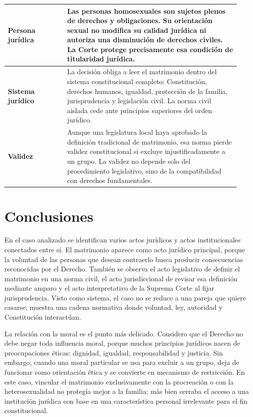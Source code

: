\documentclass[
	spanish,
	letterpaper, oneside
]{article}
\begin{document}
\begin{landscape}
\begin{longtable}{@{}p{0.24\linewidth}p{0.70\linewidth}@{}}
\textbf{Persona jurídica} &
Las personas homosexuales son sujetos plenos de derechos y obligaciones. Su orientación sexual no modifica su calidad jurídica ni autoriza una disminución de derechos civiles. La Corte protege precisamente esa condición de titularidad jurídica. \\
\midrule

\textbf{Sistema jurídico} &
La decisión obliga a leer el matrimonio dentro del sistema constitucional completo: Constitución, derechos humanos, igualdad, protección de la familia, jurisprudencia y legislación civil. La norma civil aislada cede ante principios superiores del orden jurídico. \\
\midrule

\textbf{Validez} &
Aunque una legislatura local haya aprobado la definición tradicional de matrimonio, esa norma pierde validez constitucional si excluye injustificadamente a un grupo. La validez no depende solo del procedimiento legislativo, sino de la compatibilidad con derechos fundamentales. \\

\end{longtable}
\endgroup
\end{landscape}
\clearpage
\pagestyle{fancy}

\section{Conclusiones}

En el caso analizado se identifican varios actos jurídicos y actos institucionales conectados entre sí. El matrimonio aparece como acto jurídico principal, porque la voluntad de las personas que desean contraerlo busca producir consecuencias reconocidas por el Derecho. También se observa el acto legislativo de definir el matrimonio en una norma civil, el acto jurisdiccional de revisar esa definición mediante amparo y el acto interpretativo de la Suprema Corte al fijar jurisprudencia. Visto como sistema, el caso no se reduce a una pareja que quiere casarse; muestra una cadena normativa donde voluntad, ley, autoridad y Constitución interactúan.

La relación con la moral es el punto más delicado. Considero que el Derecho no debe negar toda influencia moral, porque muchos principios jurídicos nacen de preocupaciones éticas: dignidad, igualdad, responsabilidad y justicia. Sin embargo, cuando una moral particular se usa para excluir a un grupo, deja de funcionar como orientación ética y se convierte en mecanismo de restricción. En este caso, vincular el matrimonio exclusivamente con la procreación o con la heterosexualidad no protegía mejor a la familia; más bien cerraba el acceso a una institución jurídica con base en una característica personal irrelevante para el fin constitucional.
\end{document}
